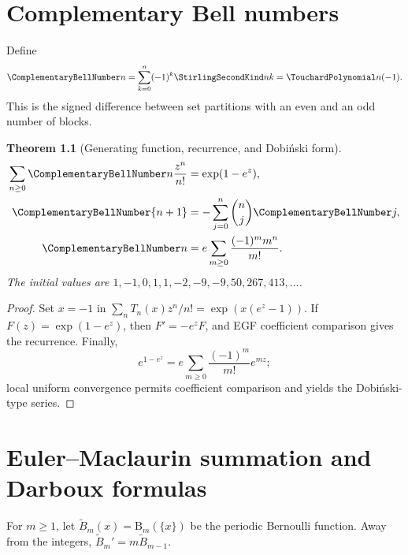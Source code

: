 \documentclass[11pt,a4paper,oneside,openany]{book}
\newtheorem{theorem}{Theorem}[chapter]
\theoremstyle{definition}
\theoremstyle{remark}
\newcommand{\BerP}[2]{\mathrm B_{#1}(#2)}
\begin{document}
\chapter{Complementary Bell numbers}

Define
\begin{equation}\label{unif:eq-complementary-bell-definition}
 \ComplementaryBellNumber n=\sum_{k=0}^{n}(-1)^k\StirlingSecondKind nk=\TouchardPolynomial n(-1).
\end{equation}
This is the signed difference between set partitions with an even and an odd
number of blocks.

\begin{theorem}[Generating function, recurrence, and Dobi\'nski form]
\label{unif:thm-complementary-bell}
\begin{align}
 \sum_{n\ge0}\ComplementaryBellNumber n\frac{z^n}{n!}&=\exp(1-e^z),
 \label{unif:eq-complementary-bell-egf}\\
 \ComplementaryBellNumber{n+1}&=-\sum_{j=0}^{n}\binom nj\ComplementaryBellNumber j,
 \label{unif:eq-complementary-bell-recurrence}\\
 \ComplementaryBellNumber n&=e\sum_{m\ge0}\frac{(-1)^m m^n}{m!}.
 \label{unif:eq-complementary-bell-dobinski}
\end{align}
The initial values are
$1,-1,0,1,1,-2,-9,-9,50,267,413,\ldots$.
\end{theorem}
\begin{proof}
Set $x=-1$ in
$\sum_nT_n(x)z^n/n!=\exp(x(e^z-1))$. If
$F(z)=\exp(1-e^z)$, then $F'=-e^zF$, and EGF coefficient comparison gives the
recurrence. Finally,
\[
 e^{1-e^z}=e\sum_{m\ge0}\frac{(-1)^m}{m!}e^{mz};
\]
local uniform convergence permits coefficient comparison and yields the
Dobi\'nski-type series.
\end{proof}

\chapter{Euler--Maclaurin summation and Darboux formulas}

For $m\ge1$, let $\widetilde B_m(x)=\BerP m{\{x\}}$ be the periodic Bernoulli
function. Away from the integers,
$\widetilde B_m'=m\widetilde B_{m-1}$.
\end{document}
